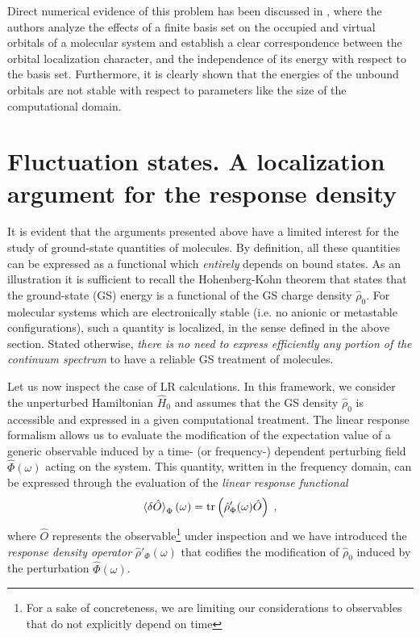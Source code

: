\documentclass[reprint,aps,prb]{revtex4-1}
\newcommand{\be}{\begin{equation}}
\newcommand{\ee}{\end{equation}}
\newcommand{\lb}{\label}
\newcommand{\op}[1]{\hat {#1}}
\newcommand{\trace}[1]{\mathrm{tr}\left(#1\right)}
\newcommand{\dmnot}{\op{\rho}_0}
\newcommand{\dm}{\op{\rho}}
\newcommand{\hnot}{\op{H}_0}
\begin{document}
Direct numerical evidence of this problem has been discussed in \cite{boffi2016}, where the authors analyze the effects of a finite basis set on the
occupied and virtual orbitals of a molecular system and establish a clear correspondence between the orbital localization character,
and the independence of its energy with respect to the basis set.
Furthermore, it is clearly shown that the energies of the unbound orbitals are not stable with respect to parameters like the size of the computational domain.

\section{Fluctuation states. A localization argument for the response density}
\label{FluctuationState}
It is evident that the arguments presented above have a limited interest for the study
of ground-state quantities of molecules. By definition, all these quantities can be expressed as a
functional which \emph{entirely} depends on bound states. As an illustration it is sufficient to recall
the Hohenberg-Kohn theorem that states that the ground-state (GS) energy is a functional of the GS
charge density $\dmnot$. For molecular systems which are electronically stable (i.e. no anionic or metastable configurations),
such a quantity is localized, in the sense defined in the above section. Stated otherwise,
\emph{there is no need to express efficiently any portion of the continuum spectrum} to have a reliable GS treatment of molecules.

Let us now inspect the case of LR calculations.
In this framework, we consider the unperturbed Hamiltonian $\hnot$ and assumes that
the GS density $\dmnot$ is accessible and expressed in a given computational treatment.
The linear response formalism allows us to evaluate the modification of the expectation value of a generic observable induced by a
time- (or frequency-) dependent perturbing field $\op\Phi(\omega)$ acting on the system.
This quantity, written in the frequency domain, can be expressed through the evaluation of the \emph{linear response functional}
\be\lb{LinearResponseFunctDef1}
\braket{\delta\op O}_\Phi(\omega) = \trace{\dm'_\Phi(\omega)\op O} \;,
\ee
where $\op O$ represents the observable\footnote{For a sake of concreteness, we are limiting our considerations to observables that do not explicitly depend on time} under inspection
and we have introduced the \emph{response density operator} $\dm'_\Phi(\omega)$ that codifies the modification of $\dmnot$ induced by the perturbation $\op\Phi(\omega)$.
\end{document}
